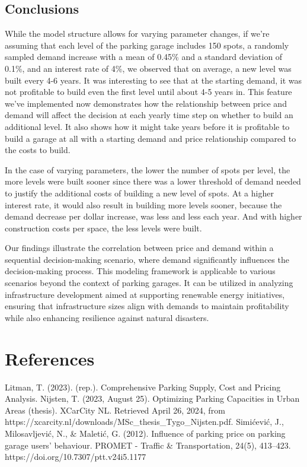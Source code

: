 \documentclass[
  letterpaper,
  DIV=11,
  numbers=noendperiod]{scrartcl}
\newlength{\cslhangindent}
\newenvironment{CSLReferences}[2] %
 {\begin{list}{}{%
  \setlength{\itemindent}{0pt}
  \setlength{\leftmargin}{0pt}
  \setlength{\parsep}{0pt}
  \ifodd #1
   \setlength{\leftmargin}{\cslhangindent}
   \setlength{\itemindent}{-1\cslhangindent}
  \fi
  \setlength{\itemsep}{#2\baselineskip}}}
 {\end{list}}
\begin{document}
\subsection{Conclusions}\label{conclusions-1}

While the model structure allows for varying parameter changes, if we're
assuming that each level of the parking garage includes 150 spots, a
randomly sampled demand increase with a mean of 0.45\% and a standard
deviation of 0.1\%, and an interest rate of 4\%, we observed that on
average, a new level was built every 4-6 years. It was interesting to
see that at the starting demand, it was not profitable to build even the
first level until about 4-5 years in. This feature we've implemented now
demonstrates how the relationship between price and demand will affect
the decision at each yearly time step on whether to build an additional
level. It also shows how it might take years before it is profitable to
build a garage at all with a starting demand and price relationship
compared to the costs to build.

In the case of varying parameters, the lower the number of spots per
level, the more levels were built sooner since there was a lower
threshold of demand needed to justify the additional costs of building a
new level of spots. At a higher interest rate, it would also result in
building more levels sooner, because the demand decrease per dollar
increase, was less and less each year. And with higher construction
costs per space, the less levels were built.

Our findings illustrate the correlation between price and demand within
a sequential decision-making scenario, where demand significantly
influences the decision-making process. This modeling framework is
applicable to various scenarios beyond the context of parking garages.
It can be utilized in analyzing infrastructure development aimed at
supporting renewable energy initiatives, ensuring that infrastructure
sizes align with demands to maintain profitability while also enhancing
resilience against natural disasters.

\section{References}\label{references}

Litman, T. (2023). (rep.). Comprehensive Parking Supply, Cost and
Pricing Analysis. Nijsten, T. (2023, August 25). Optimizing Parking
Capacities in Urban Areas (thesis). XCarCity NL. Retrieved April 26,
2024, from https://xcarcity.nl/downloads/MSc\_thesis\_Tygo\_Nijsten.pdf.
Simićević, J., Milosavljević, N., \& Maletić, G. (2012). Influence of
parking price on parking garage users' behaviour. PROMET - Traffic \&
Transportation, 24(5), 413--423. https://doi.org/10.7307/ptt.v24i5.1177

\label{refs}
\begin{CSLReferences}{0}{1}
\end{CSLReferences}
\end{document}

